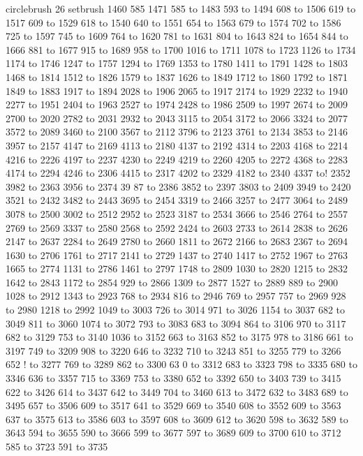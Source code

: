 circlebrush 26 setbrush
1460 585 1471 585 to 1483 593 to 1494 608 to 1506 619 to 1517 609 to 1529 618 to 1540 640 to 1551 654 to 1563 679 to 1574 702 to 1586 725 to 1597 745 to 1609 764 to 1620 781 to 1631 804 to 1643 824 to 1654 844 to 1666 881 to 1677 915 to 1689 958 to 1700 1016 to 1711 1078 to 1723 1126 to 1734 1174 to 1746 1247 to 1757 1294 to 1769 1353 to 1780 1411 to 1791 1428 to 1803 1468 to 1814 1512 to 1826 1579 to 1837 1626 to 1849 1712 to 1860 1792 to 1871 1849 to 1883 1917 to 1894 2028 to 1906 2065 to 1917 2174 to 1929 2232 to 1940 2277 to 1951 2404 to 1963 2527 to 1974 2428 to 1986 2509 to 1997 2674 to 2009 2700 to 2020 2782 to 2031 2932 to 2043 3115 to 2054 3172 to 2066 3324 to 2077 3572 to 2089 3460 to 2100 3567 to 2112 3796 to 2123 3761 to 2134 3853 to 2146 3957 to 2157 4147 to 2169 4113 to 2180 4137 to 2192 4314 to 2203 4168 to 2214 4216 to 2226 4197 to 2237 4230 to 2249 4219 to 2260 4205 to 2272 4368 to 2283 4174 to 2294 4246 to 2306 4415 to 2317 4202 to 2329 4182 to 2340 4337 to!
 2352 3982 to 2363 3956 to 2374 39
87 to 2386 3852 to 2397 3803 to 2409 3949 to 2420 3521 to 2432 3482 to 2443 3695 to 2454 3319 to 2466 3257 to 2477 3064 to 2489 3078 to 2500 3002 to 2512 2952 to 2523 3187 to 2534 3666 to 2546 2764 to 2557 2769 to 2569 3337 to 2580 2568 to 2592 2424 to 2603 2733 to 2614 2838 to 2626 2147 to 2637 2284 to 2649 2780 to 2660 1811 to 2672 2166 to 2683 2367 to 2694 1630 to 2706 1761 to 2717 2141 to 2729 1437 to 2740 1417 to 2752 1967 to 2763 1665 to 2774 1131 to 2786 1461 to 2797 1748 to 2809 1030 to 2820 1215 to 2832 1642 to 2843 1172 to 2854 929 to 2866 1309 to 2877 1527 to 2889 889 to 2900 1028 to 2912 1343 to 2923 768 to 2934 816 to 2946 769 to 2957 757 to 2969 928 to 2980 1218 to 2992 1049 to 3003 726 to 3014 971 to 3026 1154 to 3037 682 to 3049 811 to 3060 1074 to 3072 793 to 3083 683 to 3094 864 to 3106 970 to 3117 682 to 3129 753 to 3140 1036 to 3152 663 to 3163 852 to 3175 978 to 3186 661 to 3197 749 to 3209 908 to 3220 646 to 3232 710 to 3243 851 to 3255 779 to 3266 652 !
to 3277 769 to 3289 862 to 3300 63
0 to 3312 683 to 3323 798 to 3335 680 to 3346 636 to 3357 715 to 3369 753 to 3380 652 to 3392 650 to 3403 739 to 3415 622 to 3426 614 to 3437 642 to 3449 704 to 3460 613 to 3472 632 to 3483 689 to 3495 657 to 3506 609 to 3517 641 to 3529 669 to 3540 608 to 3552 609 to 3563 637 to 3575 613 to 3586 603 to 3597 608 to 3609 612 to 3620 598 to 3632 589 to 3643 594 to 3655 590 to 3666 599 to 3677 597 to 3689 609 to 3700 610 to 3712 585 to 3723 591 to 3735
